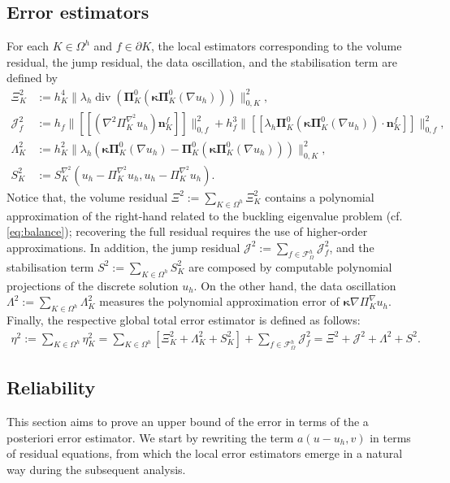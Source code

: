 \documentclass[final,reqno]{elsarticle}
\newcommand\vdiv{\mathop{\mathrm{div}}\nolimits}
\newcommand\cF{\mathcal{F}}
\newcommand\cJ{\mathcal{J}}
\newcommand{\norm}[1]{\|#1\|}
\newcommand{\jump}[1]{[\![#1]\!]}
\def\bn{\boldsymbol{n}}
\def\bkappa{\boldsymbol{\kappa}}
\def\bPi{\mathbf{\Pi}}
\begin{document}
\subsection{Error estimators} 
For each $K\in \Omega^h$ and $f\in \partial K$, the local estimators corresponding to the volume residual, the jump residual, the data oscillation, and the stabilisation term are defined by
\begin{subequations}\label{terms_estimator}
    \begin{align}
        \Xi_{K}^2 &:= h_K^4 \norm{\lambda_h \vdiv\left(\bPi_K^0(\bkappa \bPi_K^0(\nabla u_h))\right)}_{0,K}^2,\label{vol_est}\\
        \cJ_{f}^2 &:= h_f \norm{\jump{(\nabla^2\Pi_K^{\nabla^2} u_h )\bn_K^f}}_{0,f}^2 + h_f^{3}\norm{\jump{\lambda_h\bPi_K^0(\bkappa \bPi_K^0(\nabla u_h ))\cdot \bn_K^f}}_{0,f}^2,\label{jump_est}\\
        \Lambda_K^2 & := h_K^2\norm{\lambda_h \left(\bkappa \bPi_K^0(\nabla u_h)-\bPi_K^0(\bkappa \bPi_K^0(\nabla u_h))\right)}_{0,K}^2, \label{data_est}\\
        S_{K}^2 &:= S_K^{\nabla^2}(u_h-\Pi_K^{\nabla^2} u_h,u_h-\Pi_K^{\nabla^2} u_h) %
        .\label{stab_est}
    \end{align}
\end{subequations}
Notice that, the volume residual $\Xi^2 := \sum_{K\in \Omega^h} \Xi_K^2$ contains a polynomial approximation of the right-hand related to the buckling eigenvalue problem (cf. \eqref{eq:balance}); recovering the full residual requires the use of higher-order approximations. In addition, the jump residual $\cJ^2 := \sum_{f\in \cF^h_\Omega} \cJ_f^2$, and the stabilisation term $S^2 := \sum_{K\in \Omega^h} S_K^2$ are composed by computable polynomial projections of the discrete solution $u_h$. On the other hand, the data oscillation $\Lambda^2 := \sum_{K\in \Omega^h} \Lambda_K^2$ measures the polynomial approximation error of $\bkappa \nabla \Pi_K^{\nabla} u_h$. Finally, the respective global total error estimator is defined as follows:
\begin{align*}%
\eta^2:= \sum_{K\in \Omega^h} \eta_K^2 = \sum_{K\in \Omega^h} \left[\Xi_K^2 + \Lambda_K^2 + S_K^2\right] + \sum_{f\in \cF^h_\Omega} \cJ_f^2 =  \Xi^2 + \cJ^2 + \Lambda^2 + S^2. 
\end{align*}

\subsection{Reliability}\label{Reliablity}
This section aims to prove an upper bound of the error in terms of the a posteriori error estimator. We start by rewriting the term $a(u-u_h,v)$ in terms of residual equations, from which the local error estimators emerge in a natural way during the subsequent analysis.
\end{document}
